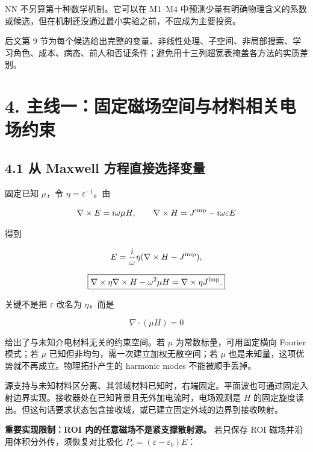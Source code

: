 \documentclass[11pt,a4paper]{article}
\begin{document}
NN 不另算第十种数学机制。它可以在 M1--M4
中预测少量有明确物理含义的系数或候选，但在机制还没通过最小实验之前，不应成为主要投资。

后文第 9
节为每个候选给出完整的变量、非线性处理、子空间、非局部搜索、学习角色、成本、病态、前人和否证条件；避免用十三列超宽表掩盖各方法的实质差别。

\hypertarget{ux4e3bux7ebfux4e00ux56faux5b9aux78c1ux573aux7a7aux95f4ux4e0eux6750ux6599ux76f8ux5173ux7535ux573aux7ea6ux675f}{%
\section{4.
主线一：固定磁场空间与材料相关电场约束}\label{ux4e3bux7ebfux4e00ux56faux5b9aux78c1ux573aux7a7aux95f4ux4e0eux6750ux6599ux76f8ux5173ux7535ux573aux7ea6ux675f}}

\hypertarget{ux4ece-maxwell-ux65b9ux7a0bux76f4ux63a5ux9009ux62e9ux53d8ux91cf}{%
\subsection{4.1 从 Maxwell
方程直接选择变量}\label{ux4ece-maxwell-ux65b9ux7a0bux76f4ux63a5ux9009ux62e9ux53d8ux91cf}}

固定已知 \(\mu\)，令 \(\eta=\varepsilon^{-1}\)。由

\[
\nabla\times E=i\omega\mu H,\qquad
\nabla\times H=J^{\rm imp}-i\omega\varepsilon E
\]

得到

\[
E=\frac{i}{\omega}\eta(\nabla\times H-J^{\rm imp}),
\]

\[
\boxed{\nabla\times\eta\nabla\times H-\omega^2\mu H
=\nabla\times\eta J^{\rm imp}.}
\]

关键不是把 \(\varepsilon\) 改名为 \(\eta\)，而是

\[
\boxed{\nabla\cdot(\mu H)=0}
\]

给出了与未知介电材料无关的约束空间。若 \(\mu\) 为常数标量，可用固定横向
Fourier 模式；若 \(\mu\) 已知但非均匀，需一次建立加权无散空间；若
\(\mu\) 也是未知量，这项优势就不再成立。物理拓扑产生的 harmonic modes
不能被顺手丢掉。

源支持与未知材料区分离、其邻域材料已知时，右端固定。平面波也可通过固定入射边界实现。接收器处在已知背景且无外加电流时，电场观测是
\(H\)
的固定旋度读出。但这句话要求状态包含接收域，或已建立固定外域的边界到接收映射。

\textbf{重要实现限制：ROI 内的任意磁场不是紧支撑散射源。} 若只保存 ROI
磁场并沿用体积分外传，须恢复对比极化
\(P_c=(\varepsilon-\varepsilon_b)E\)：
\end{document}
